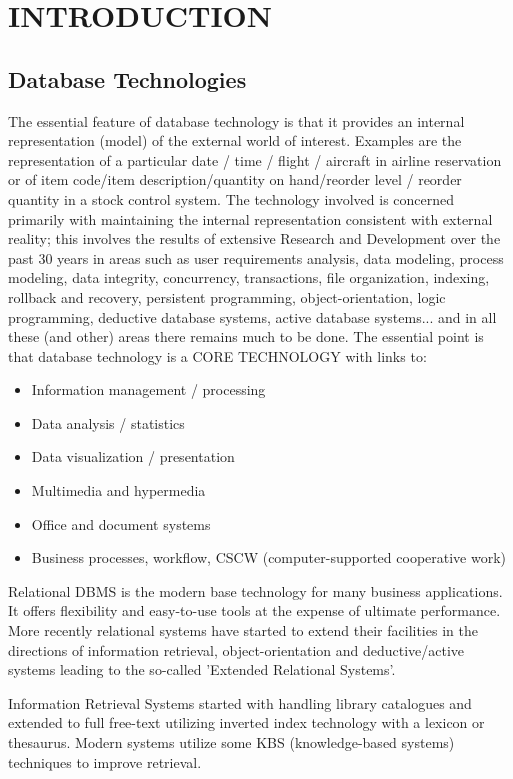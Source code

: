 \chapter{INTRODUCTION}

\section{Database Technologies}
The essential feature of database technology is that it provides an internal representation (model) of the external world of interest. Examples are the representation of a particular date / time / flight / aircraft in airline reservation or of item code/item description/quantity on hand/reorder level / reorder quantity in a stock control system. The technology involved is concerned primarily with maintaining the internal representation consistent with external reality; this involves the results of extensive Research and Development over the past 30 years in areas such as user requirements analysis, data modeling, process modeling, data integrity, concurrency, transactions, file organization, indexing, rollback and recovery, persistent programming, object-orientation, logic programming, deductive database systems, active database systems... and in all these (and other) areas there remains much to be done. The essential point is that database technology is a CORE TECHNOLOGY with links to:
\begin{itemize}
\item{Information management / processing}
\item{Data analysis / statistics}
\item{Data visualization / presentation}
\item{Multimedia and hypermedia}
\item{Office and document systems}
\item{Business processes, workflow, CSCW (computer-supported cooperative work)}
\end{itemize}
Relational DBMS is the modern base technology for many business applications. It offers flexibility and easy-to-use tools at the expense of ultimate performance. More recently relational systems have started to extend their facilities in the directions of information retrieval, object-orientation and deductive/active systems leading to the so-called 'Extended
Relational Systems'.

Information Retrieval Systems started with handling library catalogues and extended to full free-text utilizing inverted index technology with a lexicon or thesaurus. Modern systems utilize some KBS (knowledge-based systems) techniques to improve retrieval.

